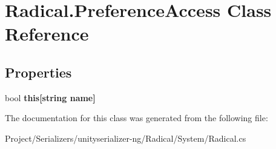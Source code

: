 \hypertarget{class_radical_1_1_preference_access}{}\section{Radical.\+Preference\+Access Class Reference}
\label{class_radical_1_1_preference_access}
\subsection*{Properties}
\begin{DoxyCompactItemize}
\item 
\mbox{\label{class_radical_1_1_preference_access_a4902b4cc8b1ce44cbf62e132123bdf10}} 
bool {\bfseries this\mbox{[}string name\mbox{]}}
\end{DoxyCompactItemize}


The documentation for this class was generated from the following file\+:\begin{DoxyCompactItemize}
\item 
Project/\+Serializers/unityserializer-\/ng/\+Radical/\+System/Radical.\+cs\end{DoxyCompactItemize}
